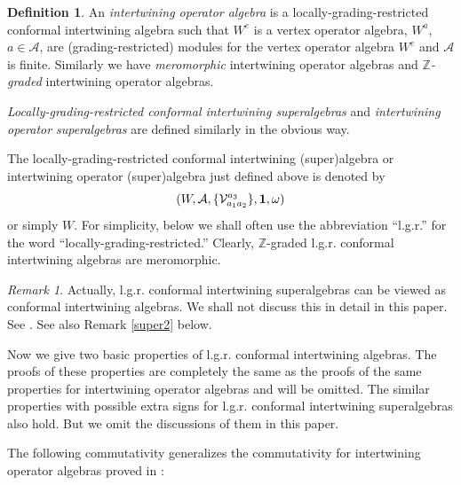 \documentclass{amsproc}
\theoremstyle{definition}
\newtheorem{defn}[thm]{Definition}
\theoremstyle{remark}
\newtheorem{rema}[thm]{Remark}
\numberwithin{equation}{section}
\begin{document}
\begin{defn}
{An {\it intertwining operator algebra} is a 
locally-grading-restricted conformal 
intertwining algebra such that
$W^{e}$ is a vertex operator algebra,
$W^{a}$, $a\in \mathcal{A}$, are (grading-restricted) modules for the
vertex operator algebra $W^{e}$ and $\mathcal{A}$ is finite.
Similarly we have {\it meromorphic} intertwining operator algebras
and {\it $\mathbb{Z}$-graded} intertwining operator algebras.

{\it Locally-grading-restricted conformal intertwining superalgebras}
and {\it intertwining operator superalgebras} are defined similarly
in the obvious way.}
\end{defn}



The locally-grading-restricted conformal 
intertwining (super)algebra or intertwining operator (super)algebra
just defined above is denoted by 
$$(W, 
\mathcal{A}, \{\mathcal{V}_{a_{1}a_{2}}^{a_{3}}\}, {\bf 1}, 
\omega)$$ 
or simply $W$. For simplicity, below we shall often use the abbreviation 
``l.g.r.'' for the word ``locally-grading-restricted.''
Clearly,  $\mathbb{Z}$-graded l.g.r. conformal 
intertwining algebras are meromorphic.

\begin{rema}\label{super1}
{\rm Actually, l.g.r. conformal intertwining superalgebras
can be viewed as conformal intertwining algebras. We shall not 
discuss this in detail in this paper. See \cite{H8}. See also 
Remark \ref{super2} below.}
\end{rema}

 
Now we give two basic properties of l.g.r. conformal 
intertwining algebras. The proofs of these properties are completely the 
same as the proofs of the same properties for intertwining operator
algebras and will be omitted. The similar properties 
with possible extra signs 
for l.g.r. conformal intertwining superalgebras also hold. But we 
omit the discussions of them in this paper.

The following commutativity generalizes the commutativity 
for intertwining operator algebras proved in \cite{H3}:
\end{document}
